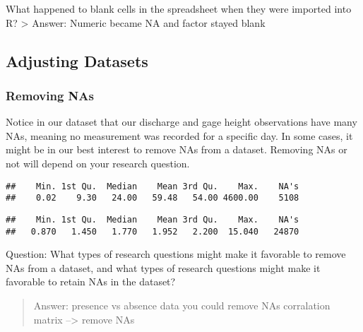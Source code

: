 \documentclass[]{article}
\newenvironment{Shaded}{\begin{snugshade}}{\end{snugshade}}
\newcommand{\KeywordTok}[1]{\textcolor[rgb]{0.13,0.29,0.53}{\textbf{#1}}}
\newcommand{\NormalTok}[1]{#1}
\newcommand{\OperatorTok}[1]{\textcolor[rgb]{0.81,0.36,0.00}{\textbf{#1}}}
\begin{document}
What happened to blank cells in the spreadsheet when they were imported
into R? \textgreater{} Answer: Numeric became NA and factor stayed blank

\hypertarget{adjusting-datasets}{%
\subsection{Adjusting Datasets}\label{adjusting-datasets}}

\hypertarget{removing-nas}{%
\subsubsection{Removing NAs}\label{removing-nas}}

Notice in our dataset that our discharge and gage height observations
have many NAs, meaning no measurement was recorded for a specific day.
In some cases, it might be in our best interest to remove NAs from a
dataset. Removing NAs or not will depend on your research question.

\begin{Shaded}
\end{Shaded}

\begin{verbatim}
##    Min. 1st Qu.  Median    Mean 3rd Qu.    Max.    NA's 
##    0.02    9.30   24.00   59.48   54.00 4600.00    5108
\end{verbatim}

\begin{Shaded}
\end{Shaded}

\begin{verbatim}
##    Min. 1st Qu.  Median    Mean 3rd Qu.    Max.    NA's 
##   0.870   1.450   1.770   1.952   2.200  15.040   24870
\end{verbatim}

Question: What types of research questions might make it favorable to
remove NAs from a dataset, and what types of research questions might
make it favorable to retain NAs in the dataset?

\begin{quote}
Answer: presence vs absence data you could remove NAs corralation matrix
--\textgreater{} remove NAs
\end{quote}
\end{document}
